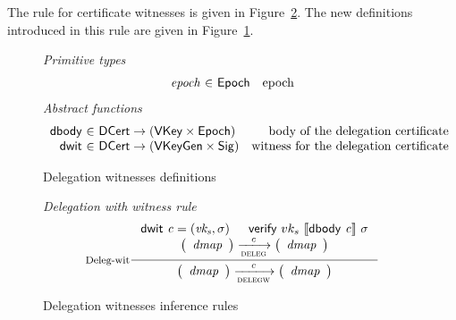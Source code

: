 The rule for certificate witnesses is given in
Figure~\ref{fig:rules:delegationw}. The new definitions introduced in this rule
are given in Figure~\ref{fig:defs:delegationw}.

\begin{figure}
  \emph{Primitive types}
  \begin{equation*}
    \begin{array}{r@{~\in~}lr}
      \var{epoch} & \Epoch & \text{epoch}
    \end{array}
  \end{equation*}
  \emph{Abstract functions}
  \begin{equation*}
    \begin{array}{r@{~\in~}lr}
      \fun{dbody} & \DCert \to (\VKey \times \Epoch)
      & \text{body of the delegation certificate}\\
      \fun{dwit} & \DCert \to (\VKeyGen \times \Sig)
      & \text{witness for the delegation certificate}
    \end{array}
  \end{equation*}
  \caption{Delegation witnesses definitions}
  \label{fig:defs:delegationw}
\end{figure}

\begin{figure}
  \emph{Delegation with witness rule}
  \begin{equation}
    \label{eq:deleg-witnesses}
    \inference[Deleg-wit]
    { \dwit{c} = (\var{vk_s}, \sigma) & \verify{vk_s}{\serialised{\dbody{c}}}{\sigma} \\
      {\left(
        \begin{array}{r}
          \var{dmap}
        \end{array}
      \right)}
      \trans{deleg}{c}
      {\left(
      \begin{array}{l}
          \var{dmap}
      \end{array}
      \right)}
    }
    {
      {\left(
        \begin{array}{r}
          \var{dmap}
        \end{array}
      \right)}
      \trans{delegw}{c}
      {\left(
      \begin{array}{l}
          \var{dmap}
      \end{array}
      \right)}}
  \end{equation}
  \caption{Delegation witnesses inference rules}
  \label{fig:rules:delegationw}
\end{figure}
